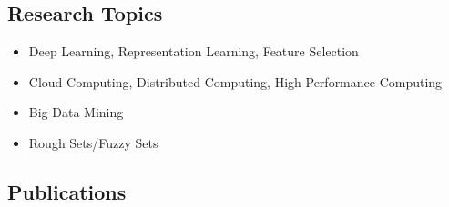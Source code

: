 \documentclass[]{article}
\begin{document}
\subsection{Research Topics}\label{research-topics}

\begin{itemize}
\itemsep1pt\parskip0pt
\item
  Deep Learning, Representation Learning, Feature Selection
\item
  Cloud Computing, Distributed Computing, High Performance Computing
\item
  Big Data Mining
\item
  Rough Sets/Fuzzy Sets
\end{itemize}

\subsection{Publications}\label{publications}
\end{document}
